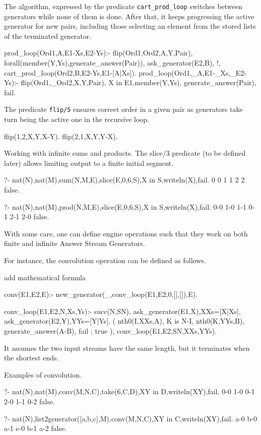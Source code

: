 \documentclass{new_tlp}
\begin{document}
The algorithm, expressed by the predicate {\tt cart\_prod\_loop}
switches between generators while none of them is done.
After that, it keeps progressing the active generator 
for new pairs, including those selecting an element 
from the stored lists of the terminated generator.
\begin{code}
prod_loop(Ord1,A,E1-Xs,E2-Ys):-
  flip(Ord1,Ord2,A,Y,Pair),
  forall(member(Y,Ys),generate_answer(Pair)),
  ask_generator(E2,B),
  !,
  cart_prod_loop(Ord2,B,E2-Ys,E1-[A|Xs]).
prod_loop(Ord1,_A,E1-_Xs,_E2-Ys):-
  flip(Ord1,_Ord2,X,Y,Pair),
  X in E1,member(Y,Ys),
  generate_answer(Pair),
  fail.
\end{code}

The predicate {\tt flip/5} ensures correct order in a given pair
as  generators take turn being the active one in the recursive loop. 
\begin{code} 
flip(1,2,X,Y,X-Y).
flip(2,1,X,Y,Y-X).
\end{code}

\BX
Working with infinite sums and products. The slice/3 predicate (to be defined later) allows limiting output to a finite initial segment.
\begin{codex}
?- nat(N),nat(M),sum(N,M,E),slice(E,0,6,S),X in S,writeln(X),fail.
0
0
1
1
2
2
false.

?- nat(N),nat(M),prod(N,M,E),slice(E,0,6,S),X in S,writeln(X),fail.
0-0
1-0
1-1
0-1
2-1
2-0
false.
\end{codex}
\EX


With some care, one can define engine operations such that they work on both
finite and infinite Answer Stream Generators.

For instance, the convolution operation can be defined as follows.


{\Large add mathematical formula}

\begin{code}

conv(E1,E2,E):-
  new_generator(_,conv_loop(E1,E2,0,[],[]),E).

conv_loop(E1,E2,N,Xs,Ys):-
  succ(N,SN),
  ask_generator(E1,X),XXs=[X|Xs],
  ask_generator(E2,Y),YYs=[Y|Ys],
  ( nth0(I,XXs,A),
    K is N-I,
    nth0(K,YYs,B),
    generate_answer(A-B),
    fail
  ; true  
  ),
  conv_loop(E1,E2,SN,XXs,YYs).
\end{code}

It assumes the two input streams have the same length, but it terminates
when the shortest ends. 

\BX
Examples of convolution.
\begin{codex}
?- nat(N),nat(M),conv(M,N,C),take(6,C,D),XY in D,writeln(XY),fail.
0-0
1-0
0-1
2-0
1-1
0-2
false.

?- nat(N),list2generator([a,b,c],M),conv(M,N,C),XY in C,writeln(XY),fail.
a-0
b-0
a-1
c-0
b-1
a-2
false.
\end{codex}
\EX
\end{document}
